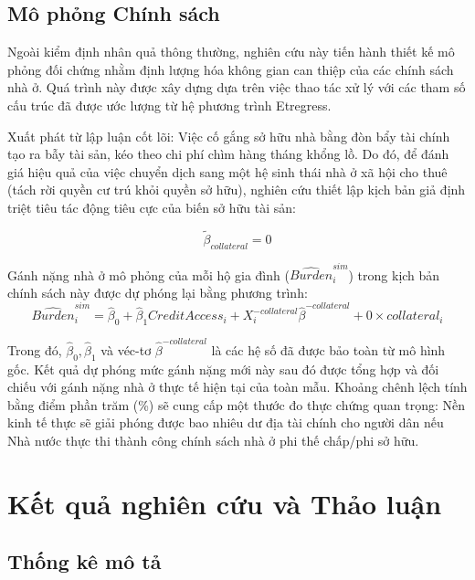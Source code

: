 \documentclass[12pt,a4paper]{report}
\begin{document}
\section{Mô phỏng Chính sách}

Ngoài kiểm định nhân quả thông thường, nghiên cứu này tiến hành thiết kế mô phỏng đối chứng nhằm định lượng hóa không gian can thiệp của các chính sách nhà ở. Quá trình này được xây dựng dựa trên việc thao tác xử lý với các tham số cấu trúc đã được ước lượng từ hệ phương trình Etregress.

Xuất phát từ lập luận cốt lõi: Việc cố gắng sở hữu nhà bằng đòn bẩy tài chính tạo ra bẫy tài sản, kéo theo chi phí chìm hàng tháng khổng lồ. Do đó, để đánh giá hiệu quả của việc chuyển dịch sang một hệ sinh thái nhà ở xã hội cho thuê (tách rời quyền cư trú khỏi quyền sở hữu), nghiên cứu thiết lập kịch bản giả định triệt tiêu tác động tiêu cực của biến sở hữu tài sản:

\begin{equation}
	\tilde{\beta}_{collateral} = 0
\end{equation}

Gánh nặng nhà ở mô phỏng của mỗi hộ gia đình ($\widehat{Burden}_i^{sim}$) trong kịch bản chính sách này được dự phóng lại bằng phương trình:
\begin{equation}
	\widehat{Burden}_i^{sim} = \hat{\beta}_0 + \hat{\beta}_1 CreditAccess_i + X_i^{-collateral} \hat{\beta}^{-collateral} + 0 \times collateral_i
\end{equation}

Trong đó, $\hat{\beta}_0, \hat{\beta}_1$ và véc-tơ $\hat{\beta}^{-collateral}$ là các hệ số đã được bảo toàn từ mô hình gốc. Kết quả dự phóng mức gánh nặng mới này sau đó được tổng hợp và đối chiếu với gánh nặng nhà ở thực tế hiện tại của toàn mẫu. Khoảng chênh lệch tính bằng điểm phần trăm (\%) sẽ cung cấp một thước đo thực chứng quan trọng: Nền kinh tế thực sẽ giải phóng được bao nhiêu dư địa tài chính cho người dân nếu Nhà nước thực thi thành công chính sách nhà ở phi thế chấp/phi sở hữu.

\chapter{Kết quả nghiên cứu và Thảo luận}

\section{Thống kê mô tả}
\end{document}
